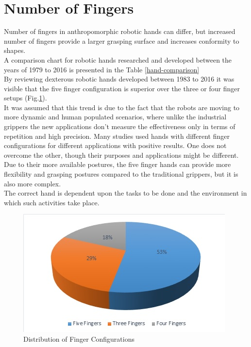 \documentclass[a4paper, 10pt, conference]{ieeeconf}      %
\begin{document}
\section{\textbf{Number of Fingers}}
Number of fingers in anthropomorphic robotic hands can differ, but increased number of fingers provide a larger grasping surface and increases conformity to shapes.\\
A comparison chart for robotic hands researched and developed between the years of 1979 to 2016 is presented in the Table \ref{hand-comparison}\\
By reviewing dexterous robotic hands developed between 1983 to 2016 \cite{ramirez20173} it was visible that the five finger configuration is superior over the three or four finger setups (Fig.\ref{fig:DistributionOfFingerConfigurations}).\\
It was assumed that this trend is due to the fact that the robots are moving to more dynamic and human populated scenarios, where unlike the industrial grippers the new applications don't measure the effectiveness only in terms of repetition and high precision. Many studies used hands with different finger configurations for different applications with positive results. One does not overcome the other, though their purposes and applications might be different.\\
Due to their more available postures, the five finger hands can provide more flexibility and grasping postures compared to the traditional grippers, but it is also more complex.\\
The correct hand is dependent upon the tasks to be done and the environment in which such activities take place.\\
\begin{figure}[h!]
\centering  \includegraphics[width=1.0\linewidth]{./images/DistributionOfFingerConfigurations}
  \caption{Distribution of Finger Configurations}
  \label{fig:DistributionOfFingerConfigurations}
	\end{figure}
\end{document}
